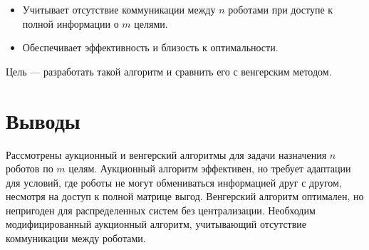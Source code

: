 \begin{itemize}
    \item Учитывает отсутствие коммуникации между \( n \) роботами при доступе к полной информации о \( m \) целями.
    \item Обеспечивает эффективность и близость к оптимальности.
\end{itemize}

Цель --- разработать такой алгоритм и сравнить его с венгерским методом.

\section{Выводы}
Рассмотрены аукционный \cite{bertsekas1990} и венгерский \cite{kuhn1955, emaxx2025} алгоритмы для задачи назначения \( n \) роботов по \( m \) целям. Аукционный алгоритм эффективен, но требует адаптации для условий, где роботы не могут обмениваться информацией друг с другом, несмотря на доступ к полной матрице выгод. Венгерский алгоритм оптимален, но непригоден для распределенных систем без централизации. Необходим модифицированный аукционный алгоритм, учитывающий отсутствие коммуникации между роботами.


